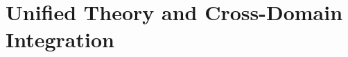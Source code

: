 \part{Unified Theory and Cross-Domain Integration}
\label{part:unified-theory-and-cross-domain-integration}


